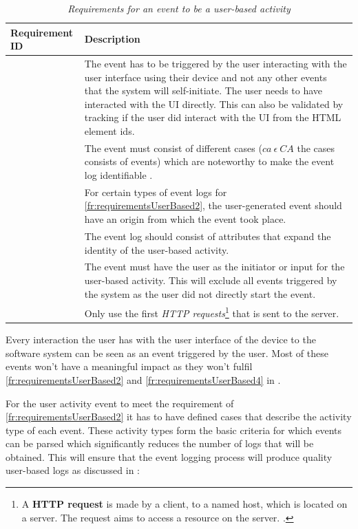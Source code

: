 \clearpage

\setcounter{phase}{1}
\setcounter{subphase}{1}
\begin{table}[!htb]
	\centering
	\caption[Requirements for an event to be a user-based activity]
	{\textit{Requirements for an event to be a user-based activity}}
	\label{tbl:ch2_requirementsForUserActivtyEvent}
	\begin{tabularx}{\textwidth}{|l|X|}
		\hline \textbf{Requirement ID} & \textbf{Description}\\
		\hline \subsubphase{fr:requirementsUserBased1} & The event has to be triggered by the user interacting with the user interface using their device and not any other events that the system will self-initiate. The user needs to have interacted with the UI directly. This can also be validated by tracking if the user did interact with the UI from the HTML element ids. \\
		\hline \subsubphase{fr:requirementsUserBased2} & The event must consist of different cases ($ca~ \epsilon~CA$ the cases consists of events) which are noteworthy to make the event log identifiable \cite{Slaninova2014}. \\
		\hline \subsubphase{fr:requirementsUserBased3} & For certain types of event logs for \ref{fr:requirementsUserBased2}, the user-generated event should have an origin from which the event took place. \\
		\hline \subsubphase{fr:requirementsUserBased4} & The event log should consist of attributes that expand the identity of the user-based activity. \\
		\hline \subsubphase{fr:requirementsUserBased5} & The event must have the user as the initiator or input for the user-based activity. This will exclude all events triggered by the system as the user did not directly start the event. \\
		\hline \subsubphase{fr:requirementsUserBased6} & Only use the first \textit{HTTP requests}\footnote{A \textbf{HTTP request} is made by a client, to a named host, which is located on a server. The request aims to access a resource on the server. \cite{IBM2021}.} that is sent to the server. \\ 
		\hline
	\end{tabularx}
\end{table}

Every interaction the user has with the user interface of the device to the software system can be seen as an event triggered by the user. Most of these events won't have a meaningful impact as they won't fulfil \ref{fr:requirementsUserBased2} and \ref{fr:requirementsUserBased4} in .\par For the user activity event to meet the requirement of \ref{fr:requirementsUserBased2} it has to have defined cases that describe the activity type of each event. These activity types form the basic criteria for which events can be parsed which significantly reduces the number of logs that will be obtained. This will ensure that the event logging process will produce quality user-based logs as discussed in :

